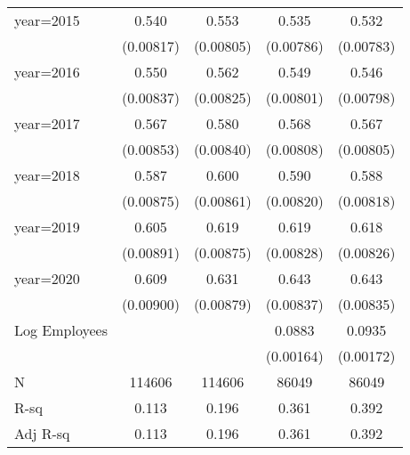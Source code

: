 \begin{table}[htbp]
\begin{tabular}{l*{4}{c}}
\addlinespace
year=2015           &       0.540\sym{***}&       0.553\sym{***}&       0.535\sym{***}&       0.532\sym{***}\\
                    &   (0.00817)         &   (0.00805)         &   (0.00786)         &   (0.00783)         \\
\addlinespace
year=2016           &       0.550\sym{***}&       0.562\sym{***}&       0.549\sym{***}&       0.546\sym{***}\\
                    &   (0.00837)         &   (0.00825)         &   (0.00801)         &   (0.00798)         \\
\addlinespace
year=2017           &       0.567\sym{***}&       0.580\sym{***}&       0.568\sym{***}&       0.567\sym{***}\\
                    &   (0.00853)         &   (0.00840)         &   (0.00808)         &   (0.00805)         \\
\addlinespace
year=2018           &       0.587\sym{***}&       0.600\sym{***}&       0.590\sym{***}&       0.588\sym{***}\\
                    &   (0.00875)         &   (0.00861)         &   (0.00820)         &   (0.00818)         \\
\addlinespace
year=2019           &       0.605\sym{***}&       0.619\sym{***}&       0.619\sym{***}&       0.618\sym{***}\\
                    &   (0.00891)         &   (0.00875)         &   (0.00828)         &   (0.00826)         \\
\addlinespace
year=2020           &       0.609\sym{***}&       0.631\sym{***}&       0.643\sym{***}&       0.643\sym{***}\\
                    &   (0.00900)         &   (0.00879)         &   (0.00837)         &   (0.00835)         \\
\addlinespace
Log Employees       &                     &                     &      0.0883\sym{***}&      0.0935\sym{***}\\
                    &                     &                     &   (0.00164)         &   (0.00172)         \\
\midrule
N                   &      114606         &      114606         &       86049         &       86049         \\
R-sq                &       0.113         &       0.196         &       0.361         &       0.392         \\
Adj R-sq            &       0.113         &       0.196         &       0.361         &       0.392         \\

\end{tabular}
\end{table}
